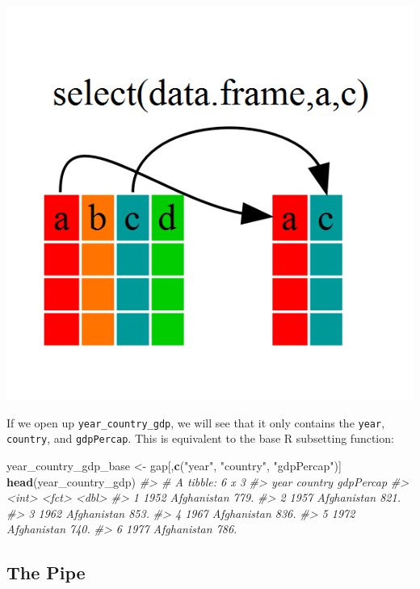 \documentclass[]{book}
\newenvironment{Shaded}{\begin{snugshade}}{\end{snugshade}}
\newcommand{\KeywordTok}[1]{\textcolor[rgb]{0.13,0.29,0.53}{\textbf{#1}}}
\newcommand{\StringTok}[1]{\textcolor[rgb]{0.31,0.60,0.02}{#1}}
\newcommand{\CommentTok}[1]{\textcolor[rgb]{0.56,0.35,0.01}{\textit{#1}}}
\newcommand{\NormalTok}[1]{#1}
\begin{document}
\begin{center}\includegraphics[width=0.7\linewidth]{img/dplyr-fig1} \end{center}

If we open up \texttt{year\_country\_gdp}, we will see that it only
contains the \texttt{year}, \texttt{country}, and \texttt{gdpPercap}.
This is equivalent to the base R subsetting function:

\begin{Shaded}
\begin{Highlighting}[]
\NormalTok{year_country_gdp_base <-}\StringTok{ }\NormalTok{gap[,}\KeywordTok{c}\NormalTok{(}\StringTok{"year"}\NormalTok{, }\StringTok{"country"}\NormalTok{, }\StringTok{"gdpPercap"}\NormalTok{)]}
\KeywordTok{head}\NormalTok{(year_country_gdp)}
\CommentTok{#> # A tibble: 6 x 3}
\CommentTok{#>    year country     gdpPercap}
\CommentTok{#>   <int> <fct>           <dbl>}
\CommentTok{#> 1  1952 Afghanistan      779.}
\CommentTok{#> 2  1957 Afghanistan      821.}
\CommentTok{#> 3  1962 Afghanistan      853.}
\CommentTok{#> 4  1967 Afghanistan      836.}
\CommentTok{#> 5  1972 Afghanistan      740.}
\CommentTok{#> 6  1977 Afghanistan      786.}
\end{Highlighting}
\end{Shaded}

\subsection{The Pipe}\label{the-pipe}
\end{document}
